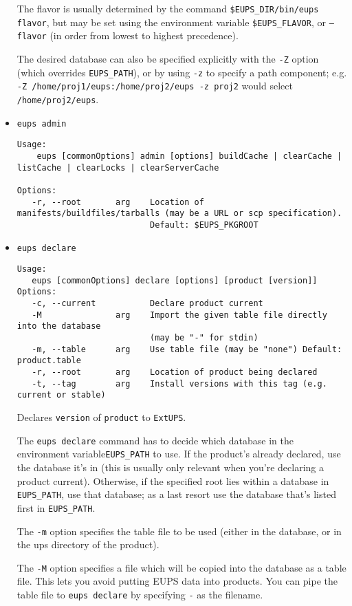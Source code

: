 \documentclass{article}
\newcommand{\code}[1]{\texttt{#1}}
\newcommand{\eups}{\code{ExtUPS}}
\begin{document}
\begin{itemize}
The flavor is usually determined by the command \code{\$EUPS\_DIR/bin/eups flavor}, but may be set using the
environment variable \code{\$EUPS\_FLAVOR}, or \code{--flavor} (in order from lowest to highest precedence).

The desired database can also be specified explicitly with the \code{-Z} option (which overrides
\code{EUPS\_PATH}), or by using \code{-z} to specify a path component; e.g.  \code{-Z
  /home/proj1/eups:/home/proj2/eups -z proj2} would select \code{/home/proj2/eups}.

\item \code{eups admin}
\begin{verbatim}
Usage:
    eups [commonOptions] admin [options] buildCache | clearCache | listCache | clearLocks | clearServerCache

Options:
   -r, --root       arg    Location of manifests/buildfiles/tarballs (may be a URL or scp specification).
                           Default: $EUPS_PKGROOT
\end{verbatim}

\item \code{eups declare}
\begin{verbatim}
Usage:
   eups [commonOptions] declare [options] [product [version]]
Options:
   -c, --current           Declare product current
   -M               arg    Import the given table file directly into the database
                           (may be "-" for stdin)
   -m, --table      arg    Use table file (may be "none") Default: product.table
   -r, --root       arg    Location of product being declared
   -t, --tag        arg    Install versions with this tag (e.g. current or stable)
\end{verbatim}

Declares \code{version} of \code{product} to \eups.

The \code{eups declare} command has to decide which database in the environment
variable\code{EUPS\_PATH}
to use.  If the product's already declared, use the database it's in (this is usually
only relevant when you're declaring a product current).  Otherwise, if the specified root
lies within a database in \code{EUPS\_PATH}, use that database; as a last resort use
the database that's listed first in \code{EUPS\_PATH}.

The \code{-m} option specifies the table
file to be used (either in the database, or in the ups directory of the product).

The \code{-M} option specifies a file which will be copied into the
database as a table file. This lets you avoid putting EUPS data
into products. You can pipe the table file to \code{eups declare} by
specifying \code{-} as the filename.


\end{itemize}
\end{document}
